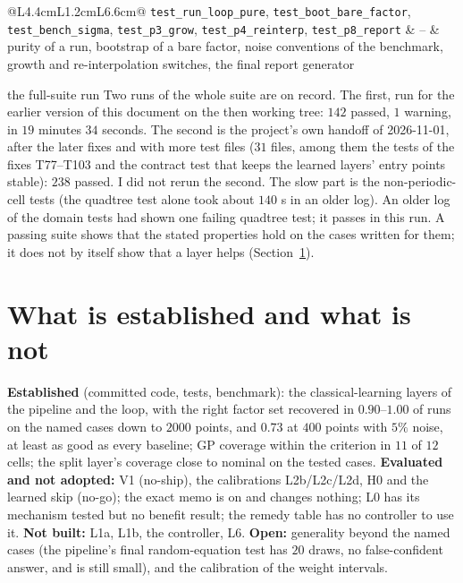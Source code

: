 \begin{table}[!htb]
\begin{tabular}{@{}L{4.4cm}L{1.2cm}L{6.6cm}@{}}
\texttt{test\_run\_loop\_pure}, \texttt{test\_boot\_bare\_factor}, \texttt{test\_bench\_sigma}, \texttt{test\_p3\_grow}, \texttt{test\_p4\_reinterp}, \texttt{test\_p8\_report} & -- & purity of a run, bootstrap of a bare factor, noise conventions of the benchmark, growth and re-interpolation switches, the final report generator\\
\bottomrule
\end{tabular}
\caption{Test functions per file; parametrised tests expand to more cases (the repository collects $142$ cases in all).}
\end{table}

\begin{explained}{the full-suite run}
Two runs of the whole suite are on record. The first, run for the earlier version of this document on the then working tree: $142$ passed, $1$ warning, in $19$ minutes $34$ seconds. The second is the project's own handoff of 2026-11-01, after the later fixes and with more test files ($31$ files, among them the tests of the fixes T77--T103 and the contract test that keeps the learned layers' entry points stable): $238$ passed. I did not rerun the second. The slow part is the non-periodic-cell tests (the quadtree test alone took about $140$ s in an older log). An older log of the domain tests had shown one failing quadtree test; it passes in this run. A passing suite shows that the stated properties hold on the cases written for them; it does not by itself show that a layer helps (Section~\ref{sec:status}).
\end{explained}

\section{What is established and what is not}\label{sec:status}
\begin{keypoint}
\textbf{Established} (committed code, tests, benchmark): the classical-learning layers of the pipeline and the loop, with the right factor set recovered in $0.90$--$1.00$ of runs on the named cases down to $2000$ points, and $0.73$ at $400$ points with $5\%$ noise, at least as good as every baseline; GP coverage within the criterion in $11$ of $12$ cells; the split layer's coverage close to nominal on the tested cases. \textbf{Evaluated and not adopted:} V1 (no-ship), the calibrations L2b/L2c/L2d, H0 and the learned skip (no-go); the exact memo is on and changes nothing; L0 has its mechanism tested but no benefit result; the remedy table has no controller to use it. \textbf{Not built:} L1a, L1b, the controller, L6. \textbf{Open:} generality beyond the named cases (the pipeline's final random-equation test has $20$ draws, no false-confident answer, and is still small), and the calibration of the weight intervals.
\end{keypoint}


